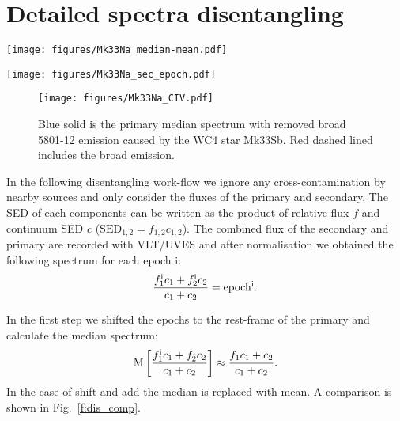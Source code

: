 \documentclass[fleqn,usenatbib]{mnras}
\begin{document}
\section{Detailed spectra disentangling}
\label{s:dsd}
\begin{figure*}
	\texttt{[image: figures/Mk33Na\_median-mean.pdf]}
	\caption{Blue solid line is the primary median spectrum while red dashed line is the averaged spectrum over all epochs (shift and add). Both spectra are similar, but the averaged spectrum (red dashed line) contains more artefacts.\label{f:dis_comp}}
\end{figure*}
\begin{figure*}
	\texttt{[image: figures/Mk33Na\_sec\_epoch.pdf]}
	\caption{Random epoch divided by the primary median spectrum. The spectrum largely shows the spectral features of the secondary.\label{f:dis_med_sec}}
\end{figure*}
\begin{figure}
	\texttt{[image: figures/Mk33Na\_CIV.pdf]}
	\caption{Blue solid is the primary median spectrum with removed broad \,5801-12 emission caused by the WC4 star Mk33Sb. Red dashed lined includes the broad  emission.\label{f:dis_wc}}
\end{figure}


In the following disentangling work-flow we ignore any cross-contamination by nearby sources and only consider the fluxes of the primary and secondary. The SED of each components can be written as the product of relative flux $f$ and continuum SED $c$ ($\mathrm{SED_{1,2}} = f_{1,2} c_{1,2}$). The combined flux of the secondary and primary are recorded with VLT/UVES and after normalisation we obtained the following spectrum for each epoch i:
\begin{equation}
\frac{f^{\rm i}_1 c_1 + f^{\rm i}_2 c_2}{c_1 + c_2} = \mathrm{epoch^i}.
\end{equation}

In the first step we shifted the epochs to the rest-frame of the primary and calculate the median spectrum:
\begin{equation}
\mathrm{M}\left[ \frac{f^{\rm i}_1 c_1 + f^{\rm i}_2 c_2}{c_1 + c_2} \right] \approx \frac{f_1 c_1 +c_2}{c_1 + c_2}.\label{e:dis_pri}
\end{equation}
In the case of shift and add \citep[e.g.][]{gonzalez2006} the median is replaced with mean. A comparison is shown in Fig.~\ref{f:dis_comp}.
\end{document}
